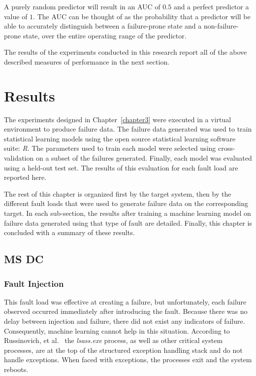 A purely random predictor will result in an \ac{AUC} of $0.5$ and a perfect
predictor a value of $1$.  The \ac{AUC} can be thought of as the probability
that a predictor will be able to accurately distinguish between a failure-prone
state and a non-failure-prone state, over the entire operating range of the
predictor.

The results of the experiments conducted in this research report all of the
above described measures of performance in the next section.

\section{Results} \label{results}
The experiments designed in Chapter~\ref{chapter3} were executed in a virtual
environment to produce failure data.  The failure data generated was used to
train statistical learning models using the open source statistical learning
software suite: \emph{R}.  The parameters used to train each model were
selected using cross-validation on a subset of the failures generated.
Finally, each model was evaluated using a held-out test set.  The results of
this evaluation for each fault load are reported here.

The rest of this chapter is organized first by the target system, then by the
different fault loads that were used to generate failure data on the
corresponding target.  In each sub-section, the results after training a
machine learning model on failure data generated using that type of fault are
detailed.  Finally, this chapter is concluded with a summary of these results.

\subsection{\ac{MS} \ac{DC}}
\subsubsection{Fault Injection}
This fault load was effective at creating a failure, but unfortunately, each
failure observed occurred immediately after introducing the fault.  Because
there was no delay between injection and failure, there did not exist any
indicators of failure.  Consequently, machine learning cannot help in this
situation.  According to Russinovich, et al.~\cite{russinovich2009} the
\emph{lsass.exe} process, as well as other critical system processes, are at
the top of the structured exception handling stack and do not handle
exceptions.  When faced with exceptions, the processes exit and the system
reboots.

